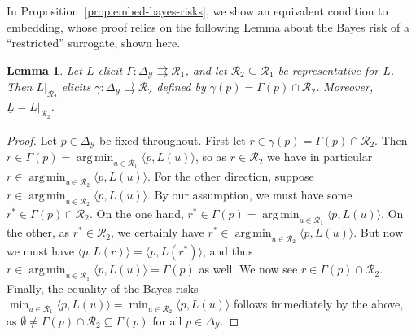 \documentclass[12pt]{article}
\newcommand{\Comments}{1}
\newcommand{\mytodo}[2]{\ifnum\Comments=1%
  \todo[linecolor=#1!80!black,backgroundcolor=#1,bordercolor=#1!80!black]{#2}\fi}
\newcommand{\jessiet}[1]{\mytodo{teal!20!white}{JF: #1}}
\newcommand{\reals}{\mathbb{R}}
\newcommand{\simplex}{\Delta_\Y}
\newcommand{\R}{\mathcal{R}}
\newcommand{\Sc}{\mathcal{S}}
\newcommand{\Y}{\mathcal{Y}}
\newcommand{\risk}[1]{\underline{#1}}
\newcommand{\inprod}[2]{\langle #1, #2 \rangle}%
\newcommand{\inter}[1]{\mathring{#1}}%
\newcommand{\toto}{\rightrightarrows}
\DeclareMathOperator*{\argmin}{arg\,min}
\newtheorem{lemma}{Lemma}
\newtheorem{definition}{Definition}
\begin{document}
In Proposition~\ref{prop:embed-bayes-risks}, we show an equivalent condition to embedding, whose proof relies on the following Lemma about the Bayes risk of a ``restricted'' surrogate, shown here.
\begin{lemma}\label{lem:loss-restrict}
  Let $L$ elicit $\Gamma:\simplex\toto\R_1$, and let $\R_2\subseteq\R_1$ be representative for $L$.
  Then $L|_{\R_2}$ elicits $\gamma:\simplex\toto\R_2$ defined by $\gamma(p) = \Gamma(p)\cap \R_2$.
  Moreover, $\risk{L}=\risk{L|_{\R_2}}$.
\end{lemma}
\begin{proof}
	Let $p\in\simplex$ be fixed throughout.
	First let $r \in \gamma(p) = \Gamma(p) \cap \R_2$.
	Then $r \in \Gamma(p) = \argmin_{u\in\R_1} \inprod{p}{L(u)}$, so as $r\in\R_2$ we have in particular $r \in \argmin_{u\in\R_2} \inprod{p}{L(u)}$.
	For the other direction, suppose $r \in \argmin_{u\in\R_2} \inprod{p}{L(u)}$.
	By our assumption, we must have some $r^* \in \Gamma(p) \cap \R_2$.
	On the one hand, $r^*\in\Gamma(p) = \argmin_{u\in\R_1} \inprod{p}{L(u)}$.
	On the other, as $r^* \in \R_2$, we certainly have $r^* \in \argmin_{u\in\R_2} \inprod{p}{L(u)}$.
	But now we must have $\inprod{p}{L(r)} = \inprod{p}{L(r^*)}$, and thus $r \in \argmin_{u\in\R_1} \inprod{p}{L(u)} = \Gamma(p)$ as well.
	We now see $r \in \Gamma(p) \cap \R_2$.
	Finally, the equality of the Bayes risks $\min_{u\in\R_1} \inprod{p}{L(u)} = \min_{u\in\R_2} \inprod{p}{L(u)}$ follows immediately by the above, as $\emptyset \neq \Gamma(p)\cap\R_2 \subseteq \Gamma(p)$ for all $p\in\simplex$.
\end{proof}


\end{document}
